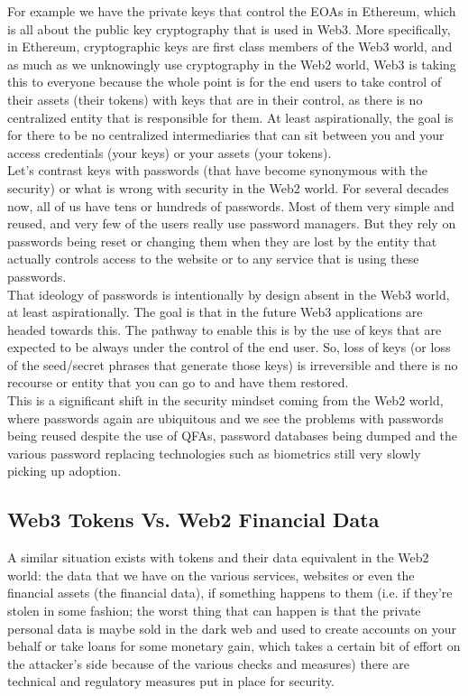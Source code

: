 For example we have the private keys that control the EOAs in Ethereum, which is all about the public key cryptography that is used in Web3.
More specifically, in Ethereum, cryptographic keys are first class members of the Web3 world, and as much as we unknowingly use cryptography in the Web2 world, Web3 is taking this to everyone because the whole point is for the end users to take control of their assets (their tokens) with keys that are in their control, as there is no centralized entity that is responsible for them.
At least aspirationally, the goal is for there to be no centralized intermediaries that can sit between you and your access credentials (your keys) or your assets (your tokens).\\

Let's contrast keys with passwords (that have become synonymous with the security) or what is wrong with security in the Web2 world.
For several decades now, all of us have tens or hundreds of passwords.
Most of them very simple and reused, and very few of the users really use password managers.
But they rely on passwords being reset or changing them when they are lost by the entity that actually controls access to the website or to any service that is using these passwords.\\

That ideology of passwords is intentionally by design absent in the Web3 world, at least aspirationally.
The goal is that in the future Web3 applications are headed towards this.
The pathway to enable this is by the use of keys that are expected to be always under the control of the end user.
So, loss of keys (or loss of the seed/secret phrases that generate those keys) is irreversible and there is no recourse or entity that you can go to and have them restored.\\

This is a significant shift in the security mindset coming from the Web2 world, where passwords again are ubiquitous and we see the problems with passwords being reused despite the use of QFAs, password databases being dumped and the various password replacing technologies such as biometrics still very slowly picking up adoption.\\

\subsection*{Web3 Tokens Vs. Web2 Financial Data}

A similar situation exists with tokens and their data equivalent in the Web2 world: the data that we have on the various services, websites or even the financial assets (the financial data), if something happens to them (i.e. if they're stolen in some fashion; the worst thing that can happen is that the private personal data is maybe sold in the dark web and used to create accounts on your behalf or take loans for some monetary gain, which takes a certain bit of effort on the attacker's side because of the various checks and measures) there are technical and regulatory measures put in place for security.\\

